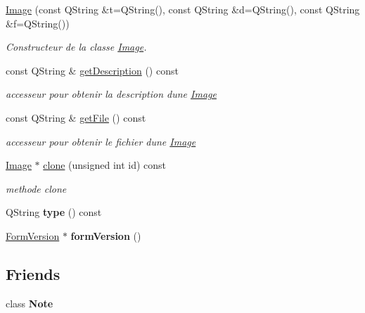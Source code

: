 \begin{DoxyCompactItemize}
\item 
\hyperlink{class_image_a1072569a682d28333fa03c94efe0c66e}{Image} (const Q\+String \&t=Q\+String(), const Q\+String \&d=Q\+String(), const Q\+String \&f=Q\+String())
\begin{DoxyCompactList}\small\item\em Constructeur de la classe \hyperlink{class_image}{Image}. \end{DoxyCompactList}\item 
\mbox{\label{class_image_a570b04dd7ff57e44f508d8a4457e2372}} 
const Q\+String \& \hyperlink{class_image_a570b04dd7ff57e44f508d8a4457e2372}{get\+Description} () const
\begin{DoxyCompactList}\small\item\em accesseur pour obtenir la description d\textquotesingle{}une \hyperlink{class_image}{Image} \end{DoxyCompactList}\item 
\mbox{\label{class_image_ac34f9d0352ba64f36e4d2c0a59acf171}} 
const Q\+String \& \hyperlink{class_image_ac34f9d0352ba64f36e4d2c0a59acf171}{get\+File} () const
\begin{DoxyCompactList}\small\item\em accesseur pour obtenir le fichier d\textquotesingle{}une \hyperlink{class_image}{Image} \end{DoxyCompactList}\item 
\hyperlink{class_image}{Image} $\ast$ \hyperlink{class_image_a31a754ded7599e3f1a9b83bdcc4437c0}{clone} (unsigned int id) const
\begin{DoxyCompactList}\small\item\em methode clone \end{DoxyCompactList}\item 
\mbox{\label{class_image_adee895eaa5e0a96c7d9a63618ac36ef4}} 
Q\+String {\bfseries type} () const
\item 
\mbox{\label{class_image_a7fadda40fc83245d4e6839c00eac57f2}} 
\hyperlink{class_form_version}{Form\+Version} $\ast$ {\bfseries form\+Version} ()
\end{DoxyCompactItemize}
\subsection*{Friends}
\begin{DoxyCompactItemize}
\item 
\mbox{\label{class_image_a93d7e72623acdfa5b079a11fbf2d9f9d}} 
class {\bfseries Note}
\end{DoxyCompactItemize}
